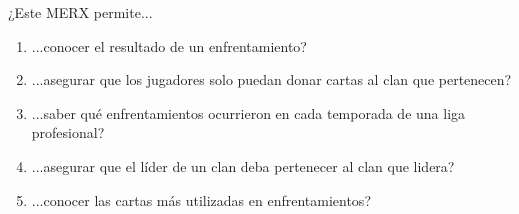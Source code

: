\begin{frame}{¿Este MERX permite...}
    \begin{enumerate}
        \item ...conocer el resultado de un enfrentamiento?
        \item ...asegurar que los jugadores solo puedan donar cartas al clan que pertenecen?
        \item ...saber qué enfrentamientos ocurrieron en cada temporada de una liga profesional?
        \item ...asegurar que el líder de un clan deba pertenecer al clan que lidera?
        \item ...conocer las cartas más utilizadas en enfrentamientos?
    \end{enumerate}

\end{frame}